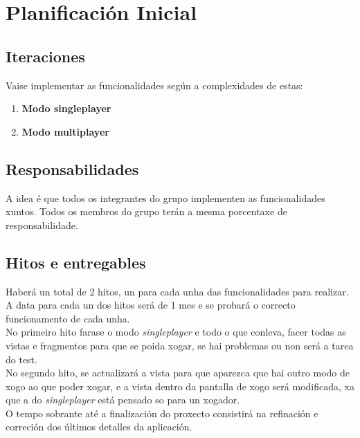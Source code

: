 \chapter{Planificación Inicial}
\label{chap:plan_inicial}

\section{Iteraciones}
Vaise implementar as funcionalidades según a complexidades de estas:
\begin{enumerate}
    \item \textbf{Modo singleplayer}
    \item \textbf{Modo multiplayer}
\end{enumerate}

\section{Responsabilidades}
A idea é que todos os integrantes do grupo implementen as funcionalidades xuntos. Todos os membros do grupo terán a mesma porcentaxe de responsabilidade.

\section{Hitos e entregables}
Haberá un total de 2 %
hitos, un para cada unha das funcionalidades para realizar. A data para cada un dos hitos será de 1 mes e se probará o correcto funcionamento de cada unha.\\

No primeiro hito farase o modo \textit{singleplayer} e todo o que conleva, facer todas as vistas e fragmentos para que se poida xogar, se hai problemas ou non será a tarea do test.\\

No segundo hito, se actualizará a vista para que aparezca que hai outro modo de xogo ao que poder xogar, e a vista dentro da pantalla de xogo será modificada, xa que a do \textit{singleplayer} está pensado so para un xogador.\\

O tempo sobrante até a finalización do proxecto consistirá na refinación e correción dos últimos detalles da aplicación.


